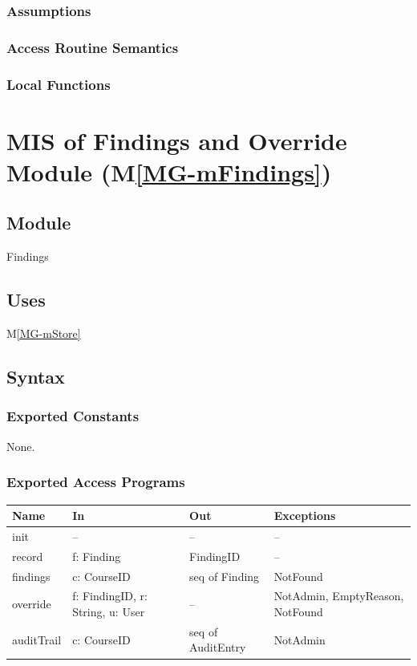 \documentclass[12pt, titlepage]{article}
\newcommand{\mref}[1]{M\ref{MG-#1}}
\begin{document}

\subsubsection{Assumptions}

\subsubsection{Access Routine Semantics}

\subsubsection{Local Functions}

\newpage

\section{MIS of Findings and Override Module (\mref{mFindings})} \label{mis-mFindings}

\subsection{Module}
Findings

\subsection{Uses}
\mref{mStore}

\subsection{Syntax}

\subsubsection{Exported Constants}
None.

\subsubsection{Exported Access Programs}
\begin{center}\small
\begin{tabular}{>{\raggedright\arraybackslash}p{3.3cm} >{\raggedright\arraybackslash}p{4.1cm} >{\raggedright\arraybackslash}p{3.4cm} >{\raggedright\arraybackslash}p{4.0cm}}
\hline
\textbf{Name} & \textbf{In} & \textbf{Out} & \textbf{Exceptions} \\
\hline
init & -- & -- & -- \\
record & f: Finding & FindingID & -- \\
findings & c: CourseID & seq of Finding & NotFound \\
override & f: FindingID, r: String, u: User & -- & NotAdmin, EmptyReason, NotFound \\
auditTrail & c: CourseID & seq of AuditEntry & NotAdmin \\
\hline
\end{tabular}
\end{center}
\end{document}
